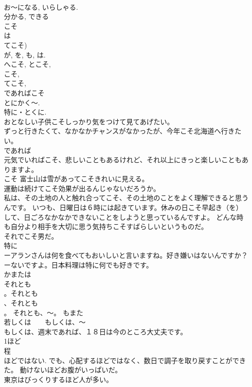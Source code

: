 \documentclass[8pt]{extreport}
\begin{document}
\begin{CJK}{UTF8}{min}
\\	お～になる, いらしゃる. 
\\	分かる, できる 
\\	こそ	
\\	は
\\	てこそ)
\\	が, を, も, は. 
\\	へこそ, とこそ, 
\\	こそ, 
\\	てこそ, 
\\	であればこそ
\\	とにかく～. 
\\	特に・とくに. 
\\	おとなしい子供こそしっかり気をつけて見てあげたい。 
\\	ずっと行きたくて、なかなかチャンスがなかったが、今年こそ北海道へ行きたい。 
\\	であれば 
\\	元気でいればこそ、悲しいこともあるけれど、それ以上にきっと楽しいこともありますよ。 
\\	こそ 富士山は雪があってこそきれいに見える。 
\\	運動は続けてこそ効果が出るんじゃないだろうか。 
\\	私は、その土地の人と触れ合ってこそ、その土地のことをよく理解できると思うんです。 いつも、日曜日は６時には起きています。休みの日こそ早起き（を）して、日ごろなかなかできないことをしようと思っているんですよ。 どんな時も自分より相手を大切に思う気持ちこそすばらしいというものだ。 
\\	それでこそ男だ。 
\\	特に 
\\	ーアランさんは何を食べてもおいしいと言いますね。好き嫌いはないんですか？ ーないですよ。日本料理は特に何でも好きです。
\\	かまたは	
\\	それとも 
\\	。それとも
\\	、それとも
\\	。 それとも、～。 もまた　 
\\	若しくは　　もしくは、～ 
\\	もしくは、週末であれば、１８日は今のところ大丈夫です。 
\\	1ほど
\\	程 
\\	ほどではない. でも、心配するほどではなく、数日で調子を取り戻すことができた。 動けないほどお腹がいっぱいだ。 
\\	東京はびっくりするほど人が多い。 

\end{CJK}
\end{document}
